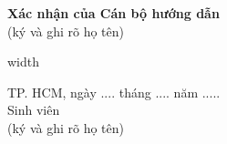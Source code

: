 \begin{mdframed}[style=decuongfield]
\vspace{3mm}
\noindent
  \begin{minipage}[c][35mm][t]{\dimexpr0.5\linewidth-\arrayrulewidth\relax}
    \vspace{4mm}\centering
    \textbf{Xác nhận của Cán bộ hướng dẫn}\\
    (ký và ghi rõ họ tên)
  \end{minipage}%
  \vrule width\arrayrulewidth
  \begin{minipage}[c][35mm][t]{\dimexpr0.5\linewidth-2\arrayrulewidth\relax}
    \vspace{4mm}\centering
    {\fontsize{11}{15}\selectfont TP. HCM, ngày .... tháng .... năm ..... }\\
    Sinh viên\\
    (ký và ghi rõ họ tên)
  \end{minipage}%

\end{mdframed}
\par
\clearpage
\endgroup
\restoregeometry
